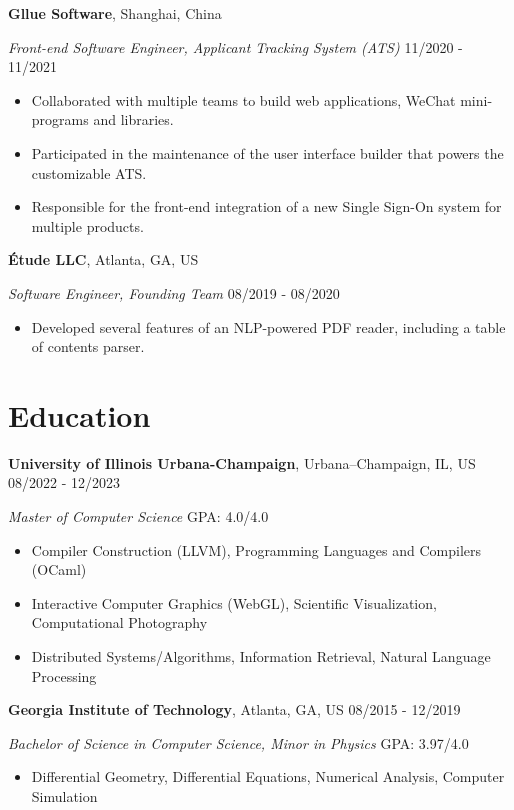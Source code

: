 \documentclass[12pt]{article}
\begin{document}
\textbf{Gllue Software}, Shanghai, China

\textit{Front-end Software Engineer, Applicant Tracking System (ATS)} \hfill 11/2020 - 11/2021

\begin{itemize}
\item Collaborated with multiple teams to build web applications, WeChat mini-programs and libraries.
\item Participated in the maintenance of the user interface builder that powers the customizable ATS.
\item Responsible for the front-end integration of a new Single Sign-On system for multiple products.
\end{itemize}

\textbf{Étude LLC}, Atlanta, GA, US

\textit{Software Engineer, Founding Team} \hfill 08/2019 - 08/2020

\begin{itemize}
\item Developed several features of an NLP-powered PDF reader, including a table of contents parser.
\end{itemize}

\section*{Education}

\textbf{University of Illinois Urbana-Champaign}, Urbana–Champaign, IL, US \hfill 08/2022 - 12/2023 

\textit{Master of Computer Science}  \hfill GPA: 4.0/4.0 
{\small
\begin{itemize}
\item Compiler Construction (LLVM), Programming Languages and Compilers (OCaml)
\item Interactive Computer Graphics (WebGL), Scientific Visualization, Computational Photography
\item Distributed Systems/Algorithms, Information Retrieval, Natural Language Processing
\end{itemize}
}


\vspace{1em}
\textbf{Georgia Institute of Technology}, Atlanta, GA, US \hfill 08/2015 - 12/2019

\textit{Bachelor of Science in Computer Science, Minor in Physics} \hfill GPA: 3.97/4.0
{\small
\begin{itemize}
\item Differential Geometry, Differential Equations, Numerical Analysis, Computer Simulation
\end{itemize}
}
\end{document}
